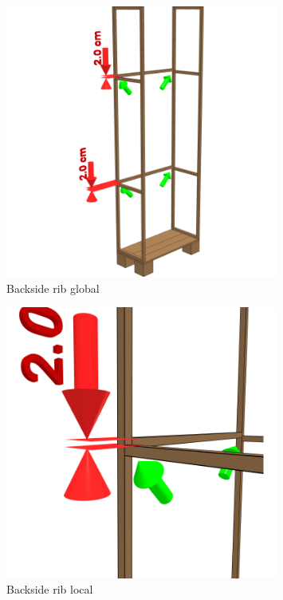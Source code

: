\documentclass{article}
\begin{document}
\begin{figure}[h!]
    \centering
    \includegraphics[width=0.8\textwidth]{scene 5 - achterrib a.png}
    \caption{Backside rib global}
    \label{fig:stap 5a}
\end{figure}

\begin{figure}[h!]
    \centering
    \includegraphics[width=0.8\textwidth]{scene 5 - achterrib b.png}
    \caption{Backside rib local}
    \label{fig:stap 5b}
\end{figure}

\clearpage
\newpage
\end{document}

